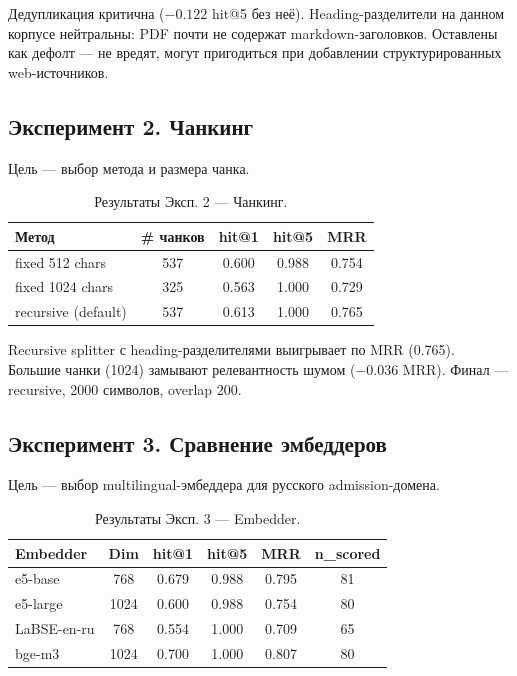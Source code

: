 \documentclass[a4paper,12pt]{extarticle}
\begin{document}
Дедупликация критична ($-0.122$ hit@5 без неё). Heading-разделители на данном корпусе нейтральны: PDF почти не содержат markdown-заголовков. Оставлены как дефолт --- не вредят, могут пригодиться при добавлении структурированных web-источников.

\subsection{Эксперимент 2. Чанкинг}

Цель --- выбор метода и размера чанка.

\begin{table}[ht]
\caption{Результаты Эксп. 2 --- Чанкинг.}
\label{tab:exp2}
\centering
\begin{tabular}{lcccc}
\toprule
Метод & \# чанков & hit@1 & hit@5 & MRR \\
\midrule
fixed 512 chars & 537 & 0.600 & 0.988 & 0.754 \\
fixed 1024 chars & 325 & 0.563 & 1.000 & 0.729 \\
recursive (default) & 537 & 0.613 & 1.000 & 0.765 \\
\bottomrule
\end{tabular}
\end{table}

Recursive splitter с heading-разделителями выигрывает по MRR (0.765). Большие чанки (1024) замывают релевантность шумом ($-0.036$ MRR). Финал --- recursive, 2000 символов, overlap 200.

\subsection{Эксперимент 3. Сравнение эмбеддеров}

Цель --- выбор multilingual-эмбеддера для русского admission-домена.

\begin{table}[ht]
\caption{Результаты Эксп. 3 --- Embedder.}
\label{tab:exp3}
\centering
\begin{tabular}{lccccc}
\toprule
Embedder & Dim & hit@1 & hit@5 & MRR & n\_scored \\
\midrule
e5-base & 768 & 0.679 & 0.988 & 0.795 & 81 \\
e5-large & 1024 & 0.600 & 0.988 & 0.754 & 80 \\
LaBSE-en-ru & 768 & 0.554 & 1.000 & 0.709 & 65 \\
bge-m3 & 1024 & 0.700 & 1.000 & 0.807 & 80 \\
\bottomrule
\end{tabular}
\end{table}
\end{document}
